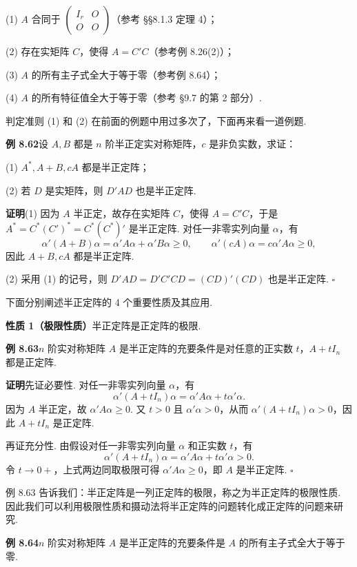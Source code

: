 \documentclass[UTF8,12pt,a4paper,fontset=fandol]{ctexart}
\begin{document}
(1) $A$ 合同于 $\left(\begin{array}{cc}I_r&O\\ O&O\end{array}\right)$（参考 §§8.1.3 定理 4）；

(2) 存在实矩阵 $C$，使得 $A=C'C$（参考例 8.26(2)）；

(3) $A$ 的所有主子式全大于等于零（参考例 8.64）；

(4) $A$ 的所有特征值全大于等于零（参考 §9.7 的第 2 部分）.

判定准则 (1) 和 (2) 在前面的例题中用过多次了，下面再来看一道例题.

\noindent\textbf{例 8.62}\quad 设 $A,B$ 都是 $n$ 阶半正定实对称矩阵，$c$ 是非负实数，求证：

(1) $A^*,A+B,cA$ 都是半正定阵；

(2) 若 $D$ 是实矩阵，则 $D'AD$ 也是半正定阵.

\noindent\textbf{证明}\quad (1) 因为 $A$ 半正定，故存在实矩阵 $C$，使得 $A=C'C$，于是 $A^*=C^*(C')^*=C^*(C^*)'$ 是半正定阵. 对任一非零实列向量 $\alpha$，有
\[
\alpha'(A+B)\alpha=\alpha'A\alpha+\alpha'B\alpha\ge 0,\qquad
\alpha'(cA)\alpha=c\alpha'A\alpha\ge 0,
\]
因此 $A+B,cA$ 都是半正定阵.

(2) 采用 (1) 的记号，则 $D'AD=D'C'CD=(CD)'(CD)$ 也是半正定阵. $\ensuremath{\square}$

下面分别阐述半正定阵的 4 个重要性质及其应用.

\noindent\textbf{性质 1（极限性质）}\quad 半正定阵是正定阵的极限.

\noindent\textbf{例 8.63}\quad $n$ 阶实对称矩阵 $A$ 是半正定阵的充要条件是对任意的正实数 $t$，$A+tI_n$ 都是正定阵.

\noindent\textbf{证明}\quad 先证必要性. 对任一非零实列向量 $\alpha$，有
\[
\alpha'(A+tI_n)\alpha=\alpha'A\alpha+t\alpha'\alpha.
\]
因为 $A$ 半正定，故 $\alpha'A\alpha\ge 0$. 又 $t>0$ 且 $\alpha'\alpha>0$，从而 $\alpha'(A+tI_n)\alpha>0$，因此 $A+tI_n$ 是正定阵.

再证充分性. 由假设对任一非零实列向量 $\alpha$ 和正实数 $t$，有
\[
\alpha'(A+tI_n)\alpha=\alpha'A\alpha+t\alpha'\alpha>0.
\]
令 $t\to 0+$，上式两边同取极限可得 $\alpha'A\alpha\ge 0$，即 $A$ 是半正定阵. $\ensuremath{\square}$

例 8.63 告诉我们：半正定阵是一列正定阵的极限，称之为半正定阵的极限性质. 因此我们可以利用极限性质和摄动法将半正定阵的问题转化成正定阵的问题来研究.

\noindent\textbf{例 8.64}\quad $n$ 阶实对称矩阵 $A$ 是半正定阵的充要条件是 $A$ 的所有主子式全大于等于零.
\end{document}
